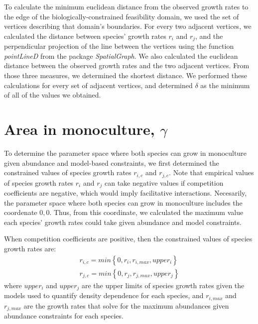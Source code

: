 \begin{refsection}
To calculate the minimum euclidean distance from the observed growth rates to the edge of the biologically-constrained feasibility domain, we used the set of vertices describing that domain's boundaries. For every two adjacent vertices, we calculated the distance between species' growth rates $r_{i}$ and $r_{j}$, and the perpendicular projection of the line between the vertices using the function \textit{pointLineD} from the package \textit{SpatialGraph}. We also calculated the euclidean distance between the observed growth rates and the two adjacent vertices. From those three measures, we determined the shortest distance. We performed these calculations for every set of adjacent vertices, and determined $\delta$ as the minimum of all of the values we obtained.


\section*{Area in monoculture, $\gamma$}

To determine the parameter space where both species can grow in monoculture given abundance and model-based constraints, we first determined the constrained values of species growth rates $r_{i,c}$ and $r_{j,c}$. Note that empirical values of species growth rates $r_{i}$ and $r_{j}$ can take negative values if competition coefficients are negative, which would imply facilitative interactions. Necesarily, the parameter space where both species can grow in monoculture includes the coordenate $0,0$. Thus, from this coordinate, we calculated the maximum value each species' growth rates could take given abundance and model constraints.

When competition coefficients are positive, then the constrained values of species growth rates are:
\begin{eqnarray}
  r_{i,c} = min\left \{0, r_{i}, r_{i,max}, upper_{i} \right \}\\
  r_{j,c} = min\left \{0, r_{j}, r_{j,max}, upper_{j} \right \}
\end{eqnarray}
where $upper_{i}$ and $upper_{j}$ are the upper limits of species growth rates given the models used to quantify density dependence for each species, and $r_{i,max}$ and  $ r_{j,max}$ are the growth rates that solve for the maximum abundances given abundance constraints for each species.


\end{refsection}

